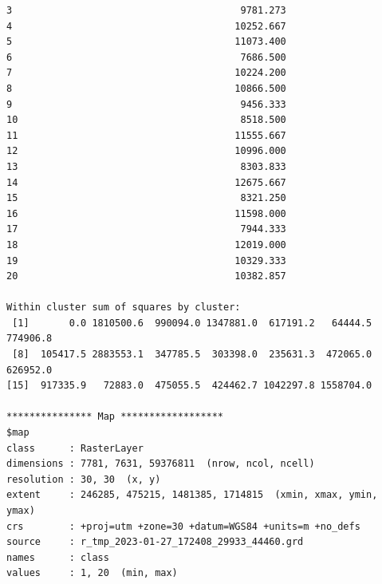 \documentclass[remotesensing,article,submit,pdftex,moreauthors]{Definitions/mdpi}
\begin{document}
\begin{scriptsize}
\begin{verbatim}
3                                        9781.273
4                                       10252.667
5                                       11073.400
6                                        7686.500
7                                       10224.200
8                                       10866.500
9                                        9456.333
10                                       8518.500
11                                      11555.667
12                                      10996.000
13                                       8303.833
14                                      12675.667
15                                       8321.250
16                                      11598.000
17                                       7944.333
18                                      12019.000
19                                      10329.333
20                                      10382.857

Within cluster sum of squares by cluster:
 [1]       0.0 1810500.6  990094.0 1347881.0  617191.2   64444.5  774906.8
 [8]  105417.5 2883553.1  347785.5  303398.0  235631.3  472065.0  626952.0
[15]  917335.9   72883.0  475055.5  424462.7 1042297.8 1558704.0

*************** Map ******************
$map
class      : RasterLayer 
dimensions : 7781, 7631, 59376811  (nrow, ncol, ncell)
resolution : 30, 30  (x, y)
extent     : 246285, 475215, 1481385, 1714815  (xmin, xmax, ymin, ymax)
crs        : +proj=utm +zone=30 +datum=WGS84 +units=m +no_defs 
source     : r_tmp_2023-01-27_172408_29933_44460.grd 
names      : class 
values     : 1, 20  (min, max)
\end{verbatim}
\end{scriptsize}
\end{document}
